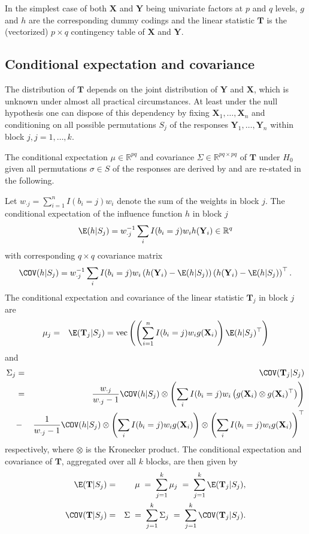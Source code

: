 \documentclass{Z}
\newcommand{\R}{\mathbb{R} }
\newcommand{\V}{\COV}
\newcommand{\X}{\mathbf{X}}
\newcommand{\Y}{\mathbf{Y}}
\newcommand{\T}{\mathbf{T}}
\renewcommand{\vec}{\text{vec}}
\begin{document}
In the simplest case of both $\X$ and $\Y$ being univariate 
factors at $p$ and $q$ levels, $g$ and $h$ are 
the corresponding dummy codings and the linear statistic $\T$ is the
(vectorized) $p \times q$ contingency table of $\X$ and $\Y$.

\subsection{Conditional expectation and covariance}

The distribution of $\T$  depends on the joint
distribution of $\Y$ and $\X$, which is unknown under almost all practical
circumstances. At least under the null hypothesis one can dispose of this
dependency by fixing $\X_1, \dots, \X_n$ and conditioning on all possible
permutations $S_j$ of the responses $\Y_1, \dots, \Y_n$ within block $j, j = 1, \dots, k$. 

The conditional expectation $\mu \in \R^{pq}$ and covariance 
$\Sigma \in \R^{pq \times pq}$ 
of $\T$ under $H_0$ given
all permutations $\sigma \in S$ of the responses are derived by
\cite{StrasserWeber1999} and are re-stated in the following.

Let $w_{\cdot j} = \sum_{i = 1}^n I(b_i = j)w_i$ denote the sum of the weights
in block $j$. The conditional expectation of the influence 
function $h$ in block $j$ 
\begin{eqnarray*}
\E(h | S_j) = w_{\cdot j}^{-1} \sum_i I(b_i = j)w_i h(\Y_i) \in \R^q
\end{eqnarray*}
with corresponding $q \times q$ covariance matrix
\begin{eqnarray*}
\V(h | S_j) = w_{\cdot j}^{-1} \sum_i I(b_i = j)w_i \left(h(\Y_i) - \E(h | S_j)
\right) \left(h(\Y_i) - \E(h | S_j)\right)^\top.
\end{eqnarray*}
The conditional expectation and covariance of the linear statistic
$\T_j$ in block $j$ are
\begin{eqnarray*}
\mu_j & = & \E(\T_j | S_j) = \vec \left( \left( \sum_{i = 1}^n I(b_i = j)w_i g(\X_i) \right) \E(h | S_j)^\top
\right)
\end{eqnarray*}
and
\begin{eqnarray*}
\Sigma_j & = & \V(\T_j | S_j) \nonumber \\
& = &
    \frac{w_{\cdot j}}{w_{\cdot j} - 1}  \V(h | S_j) \otimes
        \left(\sum_i I(b_i = j) w_i  \left( g(\X_i) \otimes g(\X_i)^\top\right) \right)
\label{expectcovar}
\\
& - & \frac{1}{w_{\cdot j} - 1}  \V(h | S_j)  \otimes \left(
        \sum_i I(b_i = j) w_i g(\X_i) \right)
\otimes \left( \sum_i I(b_i = j) w_i g(\X_i)\right)^\top
\nonumber
\end{eqnarray*}
respectively, where $\otimes$ is the Kronecker product. The conditional
expectation and covariance of $\T$, aggregated over all $k$ blocks, are
then given by
\begin{eqnarray*}
\E(\T | S_j) & = & \mu  \; = \; \sum_{j = 1}^k \mu_j  \; = \; \sum_{j = 1}^k \E(\T_j | S_j), \\
\V(\T | S_j) & = & \Sigma \; = \; \sum_{j = 1}^k \Sigma_j \; = \; \sum_{j = 1}^k \V(\T_j | S_j).
\end{eqnarray*}
\end{document}
